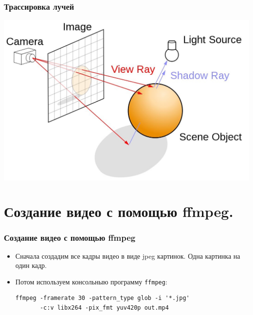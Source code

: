 \documentclass[10pt,pdf,hyperref={unicode}]{beamer}
\begin{document}
\begin{frame}[fragile]
\frametitle{Трассировка лучей} 
\begin{center}
\includegraphics[scale=0.25]{./images/ray_tracing_image.jpg}
\end{center}
\end{frame}

\section*{Создание видео с помощью ffmpeg.}
\begin{frame}[fragile]
\frametitle{Создание видео с помощью ffmpeg} 
\begin{itemize}
\item Сначала создадим все кадры видео в виде jpeg картинок. Одна картинка на один кадр.
\item Потом используем консольныю программу \texttt{ffmpeg}:
\begin{lstlisting}
ffmpeg -framerate 30 -pattern_type glob -i '*.jpg'
       -c:v libx264 -pix_fmt yuv420p out.mp4
\end{lstlisting}
\end{itemize}
\end{frame}
\end{document}

